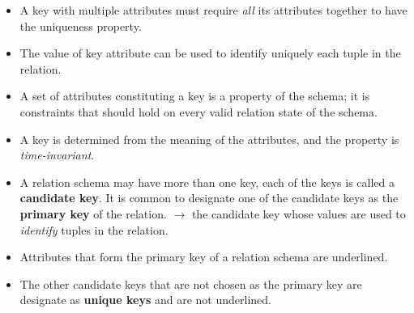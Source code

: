 \documentclass[10pt]{article}
\newcommand{\tf}{\textbf}
\newcommand{\ti}{\textit}
\begin{document}
\begin{enumerate}
\begin{itemize}
\begin{itemize}
			\item A key with multiple attributes must require \ti{all} its attributes together to have the uniqueness property.
			\item The value of key attribute can be used to identify uniquely each tuple in the relation.
			\item A set of attributes constituting a key is a property of the schema; it is constraints that should hold on every valid relation state of the schema.
			\item A key is determined from the meaning of the attributes, and the property is \ti{time-invariant}.
			\item A relation schema may have more than one key, each of the keys is called a \tf{candidate key}. It is common to designate one of the candidate keys as the \tf{primary key} of the relation. $\rightarrow$ the candidate key whose values are used to \ti{identify} tuples in the relation.
			\item Attributes that form the primary key of a relation schema are underlined.
			\item The other candidate keys that are not chosen as the primary key are designate as \tf{unique keys} and are not underlined. 
		\end{itemize}
			
	\end{itemize}


\end{enumerate}
\end{document}
